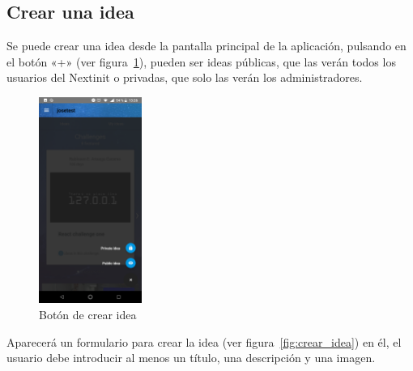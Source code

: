 \subsection{Crear una idea}

Se puede crear una idea desde la pantalla principal de la aplicación, pulsando en el botón 
«+» (ver figura~\ref{fig:inicio_crear_idea}), pueden ser ideas públicas, que las verán todos 
los usuarios del Nextinit o privadas, que solo las verán los administradores.

\begin{figure}[!h]
	\begin{center}
		\includegraphics[width=0.3\textwidth]{./img/anexo1/inicio_crear_idea.png}
		\caption{Botón de crear idea}
		\label{fig:inicio_crear_idea}
	\end{center}
\end{figure}

Aparecerá un formulario para crear la idea (ver figura~\ref{fig:crear_idea}) en él, el usuario 
debe introducir al menos un título, una descripción y una imagen.


